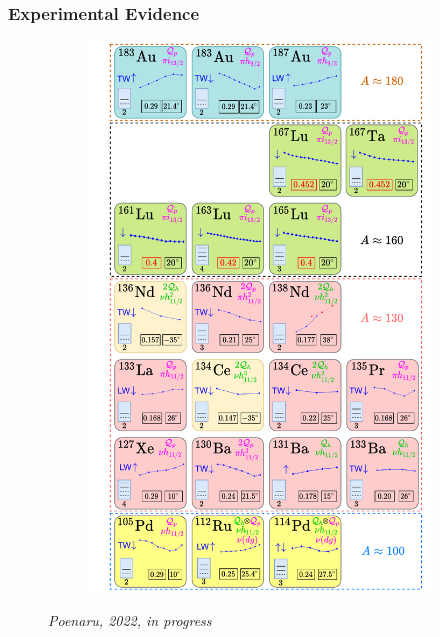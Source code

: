 \documentclass{beamer}
\begin{document}
\begin{frame}
  \frametitle{Experimental Evidence}
  \begin{figure}
    \centering
    \begin{minipage}{.5\textwidth}
      \begin{figure}
        \centering
        \includegraphics[scale=0.2]{Figs/wobblers-chart.pdf}
      \end{figure}
    \end{minipage}%
    \begin{minipage}{.5\textwidth}
      \textit{Poenaru, 2022, in progress}
    \end{minipage}
    \end{figure}
\end{frame}

\end{document}
